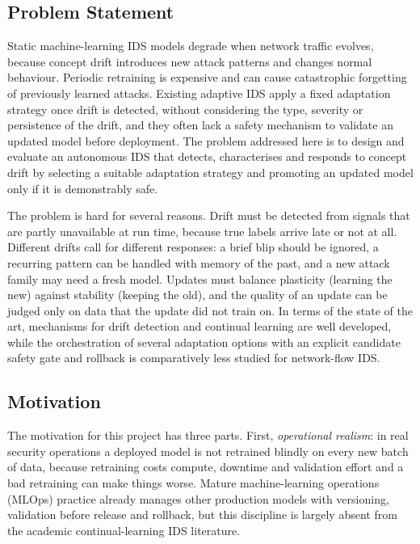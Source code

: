 \documentclass{article}
\begin{document}
\subsection{Problem Statement}

Static machine-learning IDS models degrade when network traffic evolves, because concept drift introduces new attack patterns and changes normal behaviour. Periodic retraining is expensive and can cause catastrophic forgetting of previously learned attacks. Existing adaptive IDS apply a fixed adaptation strategy once drift is detected, without considering the type, severity or persistence of the drift, and they often lack a safety mechanism to validate an updated model before deployment. The problem addressed here is to design and evaluate an autonomous IDS that detects, characterises and responds to concept drift by selecting a suitable adaptation strategy and promoting an updated model only if it is demonstrably safe.

The problem is hard for several reasons. Drift must be detected from signals that are partly unavailable at run time, because true labels arrive late or not at all. Different drifts call for different responses: a brief blip should be ignored, a recurring pattern can be handled with memory of the past, and a new attack family may need a fresh model. Updates must balance plasticity (learning the new) against stability (keeping the old), and the quality of an update can be judged only on data that the update did not train on. In terms of the state of the art, mechanisms for drift detection and continual learning are well developed, while the orchestration of several adaptation options with an explicit candidate safety gate and rollback is comparatively less studied for network-flow IDS.

\subsection{Motivation}

The motivation for this project has three parts. First, \emph{operational realism}: in real security operations a deployed model is not retrained blindly on every new batch of data, because retraining costs compute, downtime and validation effort and a bad retraining can make things worse. Mature machine-learning operations (MLOps) practice already manages other production models with versioning, validation before release and rollback, but this discipline is largely absent from the academic continual-learning IDS literature.
\end{document}
